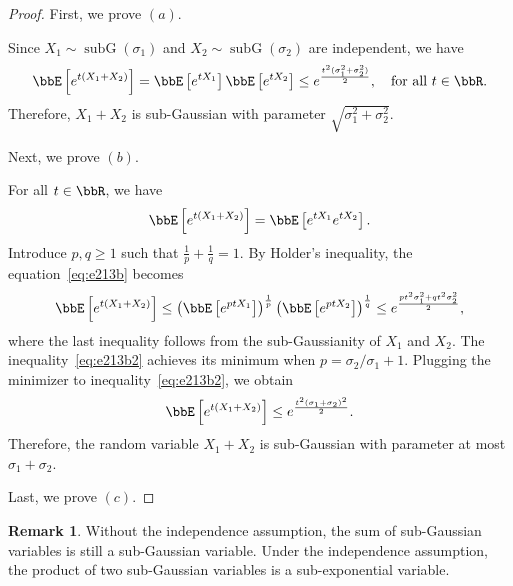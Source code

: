 \documentclass[11pt]{article}
\DeclareMathOperator{\subG}{subG}
\newcommand{\of}[1]{\left(#1\right)}
\newcommand{\off}[1]{\left[#1\right]}
\theoremstyle{plain}
\theoremstyle{definition}
\newtheorem{rmk}{Remark}
\begin{document}
\begin{proof}
	First, we prove $(a)$.
	
	\vspace{0.2cm}
	Since $X_1\sim \subG(\sigma_1)$ and $X_2 \sim \subG(\sigma_2)$ are independent, we have
	\begin{equation}
		\bbE\off{e^{t(X_1 + X_2)}} = \bbE\off{e^{tX_1}} \bbE\off{e^{tX_2}} \leq e^{\frac{t^2(\sigma_1^2 + \sigma_2^2)}{2}},\quad \text{for all }t \in \bbR.
	\end{equation}
	Therefore, $X_1 +X_2$ is sub-Gaussian with parameter $\sqrt{\sigma_1^2 + \sigma_2^2}$.
	
	\vspace{0.2cm}
Next, we prove $(b)$.

\vspace{0.2cm}
For all $t \in \bbR$, we have
\begin{equation}\label{eq:e213b}
	\bbE\off{e^{t(X_1 + X_2)}} = \bbE \off{e^{t X_1} e^{t X_2}}.
\end{equation}
Introduce $p,q \geq 1$ such that $\frac{1}{p} + \frac{1}{q} = 1$. By Holder's inequality, the equation~\eqref{eq:e213b} becomes
\begin{equation}\label{eq:e213b2}
	\bbE\off{e^{t(X_1 + X_2)}} \leq \of{\bbE \off{e^{ p t X_1}  } }^{\frac{1}{p}}
	 \of{\bbE \off{e^{ pt X_2}  }}^{\frac{1}{q}} \leq e^{  \frac{pt^2 \sigma_1^2 + qt^2 \sigma_2^2}{2} },
\end{equation}
where the last inequality follows from the sub-Gaussianity of $X_1$ and $X_2$. The inequality~\eqref{eq:e213b2} achieves its minimum when $p = \sigma_2/\sigma_1 +1$. Plugging the minimizer to inequality~\eqref{eq:e213b2}, we obtain
\begin{equation}
	\bbE\off{e^{t(X_1 + X_2)}} \leq e^{\frac{t^2(\sigma_1 + \sigma_2
	)^2}{2}}.
\end{equation}
Therefore, the random variable $X_1 + X_2$ is sub-Gaussian with parameter at most $\sigma_1 + \sigma_2$.

\vspace{0.2cm}

Last, we prove $(c)$.

\vspace{0.2cm}

\end{proof}

\begin{rmk}
	Without the independence assumption, the sum of sub-Gaussian variables is still a sub-Gaussian variable. Under the independence assumption, the product of two sub-Gaussian variables is a sub-exponential variable.
\end{rmk}
\end{document}
